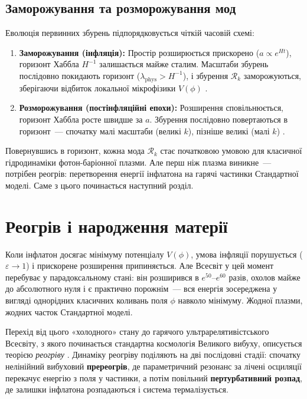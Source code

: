 \documentclass[12pt, a4paper]{article}
\begin{document}
\subsection{Заморожування та розморожування мод}

Еволюція первинних збурень підпорядковується чіткій часовій
схемі:
\begin{enumerate}
  \item \textbf{Заморожування (інфляція):} Простір розширюється
        прискорено ($a \propto e^{Ht}$), горизонт Хаббла
        $H^{-1}$ залишається майже сталим. Масштаби збурень
        послідовно покидають горизонт ($\lambda_\mathrm{phys} >
        H^{-1}$), і збурення $\mathcal{R}_k$ заморожуються,
        зберігаючи відбиток локальної мікрофізики $V(\phi)$
        \cite{bardeen_1980}.
  \item \textbf{Розморожування (постінфляційні епохи):}
        Розширення сповільнюється, горизонт Хаббла росте
        швидше за $a$. Збурення послідовно повертаються в
        горизонт~--- спочатку малі масштаби (великі $k$),
        пізніше великі (малі $k$) \cite{mukhanov_2005}.
\end{enumerate}

Повернувшись в горизонт, кожна мода $\mathcal{R}_k$ стає
початковою умовою для класичної гідродинаміки фотон-баріонної
плазми. Але перш ніж плазма виникне~--- потрібен реогрів:
перетворення енергії інфлатона на гарячі частинки Стандартної
моделі. Саме з цього починається наступний розділ.


\section{Реогрів і народження матерії}
\label{sec:reheating}

Коли інфлатон досягає мінімуму потенціалу $V(\phi)$, умова
інфляції порушується ($\varepsilon \to 1$) і прискорене
розширення припиняється. Але Всесвіт у цей момент
перебуває у парадоксальному стані: він розширився в
$e^{50}$--$e^{60}$ разів, охолов майже до абсолютного нуля
і є практично порожнім~--- вся енергія зосереджена у
вигляді однорідних класичних коливань поля $\phi$ навколо
мінімуму. Жодної плазми, жодних часток Стандартної моделі.

Перехід від цього «холодного» стану до гарячого
ультрарелятивістського Всесвіту, з якого починається
стандартна космологія Великого вибуху, описується теорією
\emph{реогріву} \cite{linde_1982, albrecht_1982}. Динаміку
реогріву поділяють на дві послідовні стадії: спочатку
нелінійний вибуховий \textbf{пререогрів}, де параметричний
резонанс за лічені осциляції перекачує енергію з поля у
частинки, а потім повільний \textbf{пертурбативний розпад},
де залишки інфлатона розпадаються і система термалізується.
\end{document}
